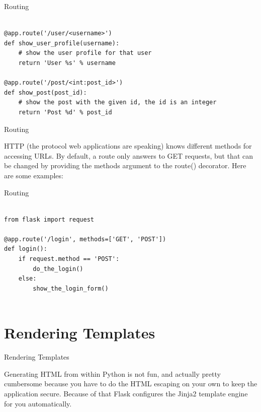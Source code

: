 \documentclass{beamer}
\begin{document}
\begin{frame}[t,fragile]{Routing}


\begin{verbatim}

@app.route('/user/<username>')
def show_user_profile(username):
    # show the user profile for that user
    return 'User %s' % username

@app.route('/post/<int:post_id>')
def show_post(post_id):
    # show the post with the given id, the id is an integer
    return 'Post %d' % post_id
\end{verbatim}


\end{frame}


\begin{frame}[t]{Routing}

HTTP (the protocol web applications are speaking) knows different methods for
accessing URLs.  By default, a route only answers to GET requests, but that
can be changed by providing the methods argument to the
route() decorator.  Here are some examples:

\end{frame}


\begin{frame}[t,fragile]{Routing}


\begin{verbatim}

from flask import request

@app.route('/login', methods=['GET', 'POST'])
def login():
    if request.method == 'POST':
        do_the_login()
    else:
        show_the_login_form()


\end{verbatim}


\end{frame}




\section{Rendering Templates}

\begin{frame}[t]{Rendering Templates}

Generating HTML from within Python is not fun, and actually pretty
cumbersome because you have to do the HTML escaping on your own to keep
the application secure.  Because of that Flask configures the Jinja2 template engine for you automatically.

\end{frame}
\end{document}
